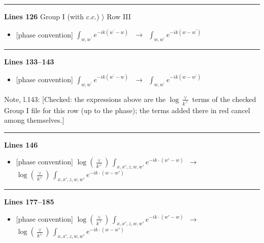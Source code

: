 \documentclass[10pt]{article}
\newenvironment{notebox}{\def\FrameCommand{{\color{notebar}\vrule width 1.5pt}\hspace{6pt}}\MakeFramed{\advance\hsize-\width\FrameRestore}\small}{\endMakeFramed}
\begin{document}
\noindent\rule{\linewidth}{0.3pt}\par\noindent\textbf{Lines 126} \quad \textsf{Group I (with c.c.) $\rangle$ Row III} \par
\begin{itemize}[leftmargin=2.2em,itemsep=1pt,topsep=2pt]
\item[\textbf{l.126}] \textsf{\small [phase convention]} $\displaystyle \int_{w, w^\prime} e^{-ik(w^\prime-w)}\,$\ $\longrightarrow$\ $\displaystyle \int_{w, w^\prime} e^{-ik(w-w^\prime)}\,$
\end{itemize}
\noindent\rule{\linewidth}{0.3pt}\par\noindent\textbf{Lines 133--143} \par
\begin{itemize}[leftmargin=2.2em,itemsep=1pt,topsep=2pt]
\item[\textbf{l.133}] \textsf{\small [phase convention]} $\displaystyle \int_{w, w^\prime} e^{-ik(w^\prime-w)}\,$\ $\longrightarrow$\ $\displaystyle \int_{w, w^\prime} e^{-ik(w-w^\prime)}\,$
\end{itemize}
\begin{notebox}\textsf{\small Note, l.143:} [Checked: the expressions above are the $\log\frac{\vee}{k^{+}}$ terms of the checked Group I file for this row (up to the phase); the terms added there in red cancel among themselves.]\end{notebox}
\noindent\rule{\linewidth}{0.3pt}\par\noindent\textbf{Lines 146} \par
\begin{itemize}[leftmargin=2.2em,itemsep=1pt,topsep=2pt]
\item[\textbf{l.146}] \textsf{\small [phase convention]} $\displaystyle \log{(\frac{\vee}{k^{+}})}\, \int_{x,x',z,w,w'}e^{-ik\cdot(w'-w)}$\ $\longrightarrow$\ $\displaystyle \log{(\frac{\vee}{k^{+}})}\, \int_{x,x',z,w,w'}e^{-ik\cdot(w-w')}$
\end{itemize}
\noindent\rule{\linewidth}{0.3pt}\par\noindent\textbf{Lines 177--185} \par
\begin{itemize}[leftmargin=2.2em,itemsep=1pt,topsep=2pt]
\item[\textbf{l.177}] \textsf{\small [phase convention]} $\displaystyle \log{(\frac{\vee}{k^{+}})}\, \int_{x,x',z,w,w'}e^{-ik\cdot(w'-w)}$\ $\longrightarrow$\ $\displaystyle \log{(\frac{\vee}{k^{+}})}\, \int_{x,x',z,w,w'}e^{-ik\cdot(w-w')}$
\end{itemize}
\end{document}
